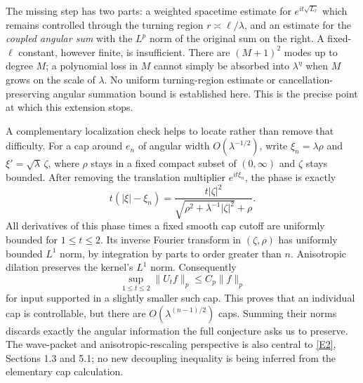 \documentclass[11pt]{article}
\newcommand{\eref}[2]{\hyperlink{extra:#1:#2}{[E#2]}}
\begin{document}
	The missing step has two parts: a weighted spacetime estimate for
	$e^{it\sqrt{L_\ell}}$ which remains controlled through the turning region
	$r\asymp\ell/\lambda$, and an estimate for the \emph{coupled angular sum}
	with the $L^p$ norm of the original sum on the right. A fixed-$\ell$
	constant, however finite, is insufficient. There are $(M+1)^2$ modes up
	to degree $M$; a polynomial loss in $M$ cannot simply be absorbed into
	$\lambda^\eta$ when $M$ grows on the scale of $\lambda$. No uniform
	turning-region estimate or cancellation-preserving angular summation
	bound is established here. This is the precise point at which this
	extension stops.
	
	A complementary localization check helps to locate rather than remove
	that difficulty. For a cap around $e_n$ of angular width
	$O(\lambda^{-1/2})$, write $\xi_n=\lambda\rho$ and
	$\xi'=\sqrt\lambda\,\zeta$, where $\rho$ stays in a fixed compact
	subset of $(0,\infty)$ and $\zeta$ stays bounded. After removing the
	translation multiplier $e^{it\xi_n}$, the phase is exactly
	\begin{equation}\label{ra30004844:capphase}
		t(|\xi|-\xi_n)=
		\frac{t|\zeta|^2}{\sqrt{\rho^2+\lambda^{-1}|\zeta|^2}+\rho}.
	\end{equation}
	All derivatives of this phase times a fixed smooth cap cutoff are
	uniformly bounded for $1\leq t\leq2$. Its inverse Fourier transform in
	$(\zeta,\rho)$ has uniformly bounded $L^1$ norm, by integration by
	parts to order greater than $n$. Anisotropic dilation preserves the
	kernel's $L^1$ norm. Consequently
	\[
	\sup_{1\leq t\leq2}\|U_tf\|_p\leq C_p\|f\|_p
	\]
	for input supported in a slightly smaller such cap. This proves that
	an individual cap is controllable, but there are
	$O(\lambda^{(n-1)/2})$ caps. Summing their norms discards exactly the
	angular information the full conjecture asks us to preserve. The
	wave-packet and anisotropic-rescaling perspective is also central to
	\eref{30004844}{2}, Sections 1.3 and 5.1; no new decoupling inequality is
	being inferred from the elementary cap calculation.
	
\end{document}
